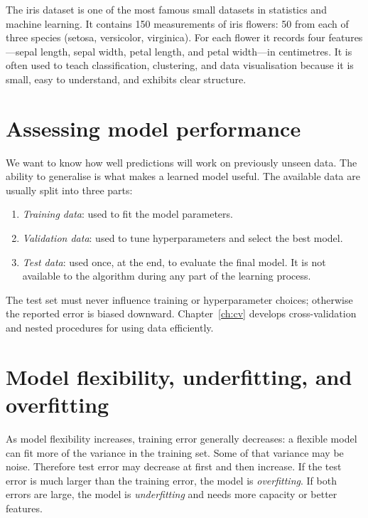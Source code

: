 \documentclass[a4paper, 12pt]{book}
\begin{document}
\begin{example}[iris]
    The iris dataset is one of the most famous small datasets in statistics and
    machine learning. It contains 150 measurements of iris flowers: 50 from each of
    three species (setosa, versicolor, virginica). For each flower it records four
    features---sepal length, sepal width, petal length, and petal width---in
    centimetres. It is often used to teach classification, clustering, and data
    visualisation because it is small, easy to understand, and exhibits clear
    structure.
\end{example}






\section{Assessing model performance}

We want to know how well predictions will work on previously unseen data. The ability
to generalise is what makes a learned model useful. The available data are usually
split into three parts:
\begin{enumerate}
    \item \emph{Training data}: used to fit the model parameters.
    \item \emph{Validation data}: used to tune hyperparameters and select the best
    model.
    \item \emph{Test data}: used once, at the end, to evaluate the final model. It is
    not available to the algorithm during any part of the learning process.
\end{enumerate}
The test set must never influence training or hyperparameter choices; otherwise the
reported error is biased downward. Chapter~\ref{ch:cv} develops cross-validation and
nested procedures for using data efficiently.

\section{Model flexibility, underfitting, and overfitting}

As model flexibility increases, training error generally decreases: a flexible model
can fit more of the variance in the training set. Some of that variance may be noise.
Therefore test error may decrease at first and then increase. If the test error is
much larger than the training error, the model is \emph{overfitting}. If both errors
are large, the model is \emph{underfitting} and needs more capacity or better
features.
\end{document}
